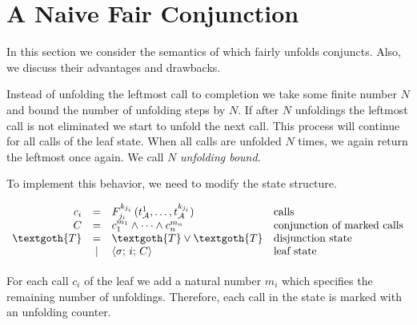 \section{A Naive Fair Conjunction}
\label{sec:naive}

In this section we consider the semantics of \mk which fairly unfolds conjuncts. Also, we discuss their advantages and drawbacks.

Instead of unfolding the leftmost call to completion we take some finite number $N$ and bound the number of unfolding steps by $N$. If after $N$ unfoldings the leftmost
call is not eliminated we start to unfold the next call. This process will continue for all calls of the leaf state. When all calls are unfolded $N$ times, we again return the leftmost once
again. We call $N$ \emph{unfolding bound}.


To implement this behavior, we need to modify the state structure.

\[
\begin{array}{rcll}
  c_i & = & F_{j_i}^{k_{j_i}}\,(t_\mathcal{A}^1,\dots,t_\mathcal{A}^{k_{j_i}}) & \mbox{calls} \\
  C & = &  c_1^{m_1} \land \dots \land c_n^{m_n}  & \mbox{conjunction of marked calls} \\
  \textgoth{T} & = & \textgoth{T} \lor \textgoth{T} & \mbox{disjunction state} \\
               & \mid & \inbr{\sigma;\, i;\, C} & \mbox{leaf state}\\[1mm]
\end{array}
\]

For each call $c_i$ of the leaf we add a natural number $m_i$ which specifies the remaining number of unfoldings. Therefore, each call in the state is marked with an unfolding counter. 

